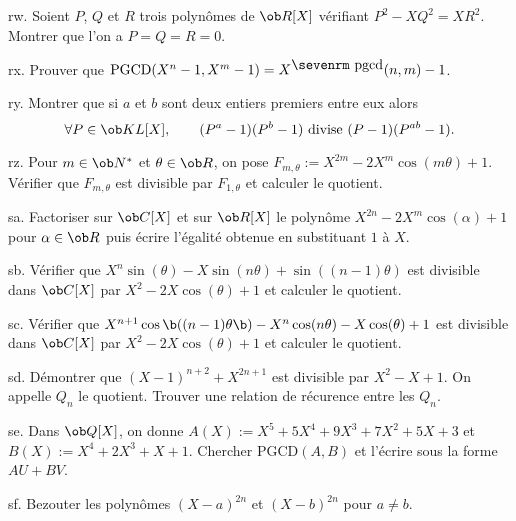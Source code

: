 \exo  [Level=1,Fight=2,Learn=1,Field=\Polynômes,Type=\Exercices,Origin=] rw. 
Soient $P$, $Q$ et $R$ trois polynômes de $\ob R[X]$ vérifiant $P^2-XQ^2=XR^2$. Montrer que l'on a $P=Q=R=0$. 

\exo  [Level=1,Fight=1,Learn=1,Field=\Polynômes,Type=\Exercices,Origin=] rx. 
Prouver que $\mbox{PGCD}(X^n-1,X^m-1)=X^{\mbox{\sevenrm pgcd}}(n,m)-1$. 

\exo  [Level=1,Fight=2,Learn=1,Field=\Polynômes,Type=\Exercices,Origin=,Indication={On commencera par établir cette propriété pour $P=X$.}] ry. 
Montrer que si $a$ et $b$ sont deux entiers premiers entre eux alors
$$
\forall P\in\ob KL[X], \qquad (P^a-1)(P^b-1)\hbox{ divise }(P-1)(P^{ab}-1). 
$$


\exo  [Level=1,Fight=1,Learn=1,Field=\Polynômes,Type=\Exercices,Origin=] rz. 
Pour $m\in\ob N^*$ et $\theta\in\ob R$, on pose $F_{m,\theta}:=X^{2m}-2X^m\cos(m\theta)+1$. \pn
Vérifier que $F_{m,\theta}$ est divisible par $F_{1,\theta}$ et calculer le quotient. 

\exo  [Level=1,Fight=1,Learn=1,Field=\Polynômes,Type=\Exercices,Origin=] sa. 
Factoriser sur $\ob C[X]$ et sur $\ob R[X]$ le polynôme $X^{2n}-2X^m\cos(\alpha)+1$ pour $\alpha\in\ob R$ puis écrire l'égalité obtenue en substituant $1$ à $X$. 

\exo  [Level=1,Fight=1,Learn=1,Field=\Polynômes,Type=\Exercices,Origin=] sb. 
Vérifier que $X^n\sin(\theta)-X\sin(n\theta)+\sin((n-1)\theta)$ est divisible dans $\ob C[X]$ par $X^2-2X\cos(\theta)+1$ et calculer le quotient. 

\exo  [Level=1,Fight=1,Learn=1,Field=\Polynômes,Type=\Exercices,Origin=] sc. 
Vérifier que $X^{n+1}\cos\b((n-1)\theta\b)-X^n\cos(n\theta)-X\cos(\theta)+1$ est divisible dans $\ob C[X]$ par $X^2-2X\cos(\theta)+1$ et calculer le quotient. 

\exo  [Level=1,Fight=1,Learn=1,Field=\Polynômes,Type=\Exercices,Origin=] sd. 
Démontrer que $(X-1)^{n+2}+X^{2n+1}$ est divisible par $X^2-X+1$. On appelle $Q_n$ le quotient. Trouver une relation de récurence entre les $Q_n$. 

\exo  [Level=1,Fight=1,Learn=1,Field=\Polynômes,Type=\Others,Origin=] se. 
Dans $\ob Q[X]$, on donne $A(X):=X^5+5X^4+9X^3+7X^2+5X+3$ et $B(X):=X^4+2X^3+X+1$. Chercher $\mbox{PGCD}(A,B)$ et l'écrire sous la forme $AU+BV$. 

\exo  [Level=1,Fight=2,Learn=1,Field=\Polynômes,Type=\Others,Origin=] sf. 
Bezouter les polynômes $(X-a)^{2n}$ et $(X-b)^{2n}$ pour $a\neq b$. 

